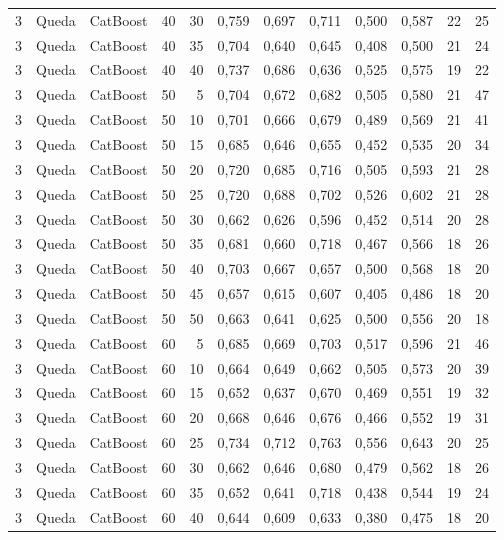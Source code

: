 \begin{longtable}{@{}rllrrrrrrrrr@{}}
3 & Queda & CatBoost & 40 & 30 & 0,759 & 0,697 & 0,711 & 0,500 & 0,587 & 22 & 25 \\
3 & Queda & CatBoost & 40 & 35 & 0,704 & 0,640 & 0,645 & 0,408 & 0,500 & 21 & 24 \\
3 & Queda & CatBoost & 40 & 40 & 0,737 & 0,686 & 0,636 & 0,525 & 0,575 & 19 & 22 \\
3 & Queda & CatBoost & 50 & 5 & 0,704 & 0,672 & 0,682 & 0,505 & 0,580 & 21 & 47 \\
3 & Queda & CatBoost & 50 & 10 & 0,701 & 0,666 & 0,679 & 0,489 & 0,569 & 21 & 41 \\
3 & Queda & CatBoost & 50 & 15 & 0,685 & 0,646 & 0,655 & 0,452 & 0,535 & 20 & 34 \\
3 & Queda & CatBoost & 50 & 20 & 0,720 & 0,685 & 0,716 & 0,505 & 0,593 & 21 & 28 \\
3 & Queda & CatBoost & 50 & 25 & 0,720 & 0,688 & 0,702 & 0,526 & 0,602 & 21 & 28 \\
3 & Queda & CatBoost & 50 & 30 & 0,662 & 0,626 & 0,596 & 0,452 & 0,514 & 20 & 28 \\
3 & Queda & CatBoost & 50 & 35 & 0,681 & 0,660 & 0,718 & 0,467 & 0,566 & 18 & 26 \\
3 & Queda & CatBoost & 50 & 40 & 0,703 & 0,667 & 0,657 & 0,500 & 0,568 & 18 & 20 \\
3 & Queda & CatBoost & 50 & 45 & 0,657 & 0,615 & 0,607 & 0,405 & 0,486 & 18 & 20 \\
3 & Queda & CatBoost & 50 & 50 & 0,663 & 0,641 & 0,625 & 0,500 & 0,556 & 20 & 18 \\
3 & Queda & CatBoost & 60 & 5 & 0,685 & 0,669 & 0,703 & 0,517 & 0,596 & 21 & 46 \\
3 & Queda & CatBoost & 60 & 10 & 0,664 & 0,649 & 0,662 & 0,505 & 0,573 & 20 & 39 \\
3 & Queda & CatBoost & 60 & 15 & 0,652 & 0,637 & 0,670 & 0,469 & 0,551 & 19 & 32 \\
3 & Queda & CatBoost & 60 & 20 & 0,668 & 0,646 & 0,676 & 0,466 & 0,552 & 19 & 31 \\
3 & Queda & CatBoost & 60 & 25 & 0,734 & 0,712 & 0,763 & 0,556 & 0,643 & 20 & 25 \\
3 & Queda & CatBoost & 60 & 30 & 0,662 & 0,646 & 0,680 & 0,479 & 0,562 & 18 & 26 \\
3 & Queda & CatBoost & 60 & 35 & 0,652 & 0,641 & 0,718 & 0,438 & 0,544 & 19 & 24 \\
3 & Queda & CatBoost & 60 & 40 & 0,644 & 0,609 & 0,633 & 0,380 & 0,475 & 18 & 20 \\

\end{longtable}
